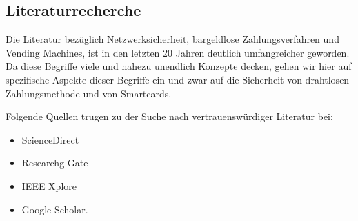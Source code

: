 \subsection{Literaturrecherche}

Die Literatur bezüglich Netzwerksicherheit, bargeldlose Zahlungsverfahren und Vending Machines, ist in den letzten 20 
Jahren deutlich umfangreicher geworden. Da diese Begriffe viele und nahezu unendlich Konzepte decken, gehen wir hier
auf spezifische Aspekte dieser Begriffe ein und zwar auf die Sicherheit von drahtlosen Zahlungsmethode und von 
Smartcards. 

Folgende Quellen trugen zu der Suche nach vertrauenswürdiger Literatur bei:

\begin{itemize}
    \item ScienceDirect
    \item Researchg Gate
    \item IEEE Xplore
    \item Google Scholar.
\end{itemize}
